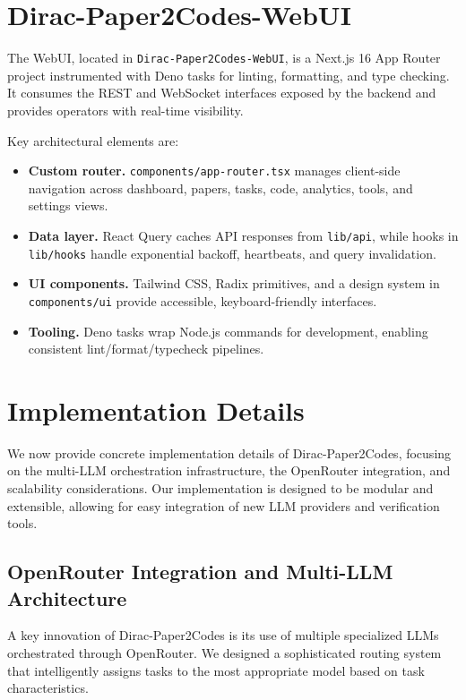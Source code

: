 \documentclass{ieeeaccess}
\begin{document}
\section{Dirac-Paper2Codes-WebUI}
The WebUI, located in \texttt{Dirac-Paper2Codes-WebUI}, is a Next.js 16 App Router project instrumented with Deno tasks for linting, formatting, and type checking. It consumes the REST and WebSocket interfaces exposed by the backend and provides operators with real-time visibility.

Key architectural elements are:
\begin{itemize}
\item \textbf{Custom router.} \texttt{components/app-router.tsx} manages client-side navigation across dashboard, papers, tasks, code, analytics, tools, and settings views.
\item \textbf{Data layer.} React Query caches API responses from \texttt{lib/api}, while hooks in \texttt{lib/hooks} handle exponential backoff, heartbeats, and query invalidation.
\item \textbf{UI components.} Tailwind CSS, Radix primitives, and a design system in \texttt{components/ui} provide accessible, keyboard-friendly interfaces.
\item \textbf{Tooling.} Deno tasks wrap Node.js commands for development, enabling consistent lint/format/typecheck pipelines.
\end{itemize}

\section{Implementation Details}\label{sec:implementation}
We now provide concrete implementation details of Dirac-Paper2Codes, focusing on the multi-LLM orchestration infrastructure, the OpenRouter integration, and scalability considerations. Our implementation is designed to be modular and extensible, allowing for easy integration of new LLM providers and verification tools.

\subsection{OpenRouter Integration and Multi-LLM Architecture}
A key innovation of Dirac-Paper2Codes is its use of multiple specialized LLMs orchestrated through OpenRouter. We designed a sophisticated routing system that intelligently assigns tasks to the most appropriate model based on task characteristics.
\end{document}

